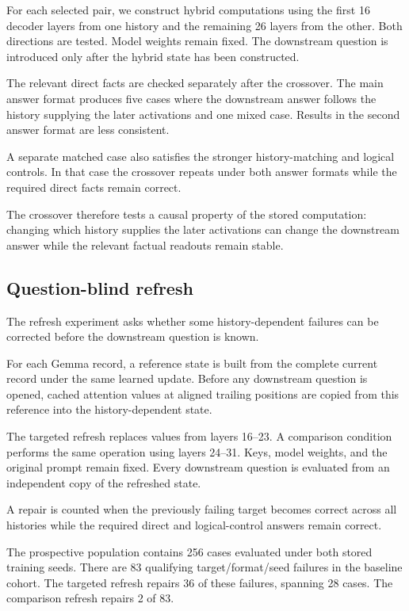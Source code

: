 \documentclass{article}
\begin{document}
For each selected pair, we construct hybrid computations using the first
16 decoder layers from one history and the remaining 26 layers from the
other. Both directions are tested. Model weights remain fixed. The
downstream question is introduced only after the hybrid state has been
constructed.

The relevant direct facts are checked separately after the crossover. The
main answer format produces five cases where the downstream answer follows
the history supplying the later activations and one mixed case. Results in
the second answer format are less consistent.

A separate matched case also satisfies the stronger history-matching and
logical controls. In that case the crossover repeats under both answer
formats while the required direct facts remain correct.

The crossover therefore tests a causal property of the stored computation:
changing which history supplies the later activations can change the
downstream answer while the relevant factual readouts remain stable.

\subsection{Question-blind refresh}
\label{app:question-blind-refresh}

The refresh experiment asks whether some history-dependent failures can be
corrected before the downstream question is known.

For each Gemma record, a reference state is built from the complete current
record under the same learned update. Before any downstream question is
opened, cached attention values at aligned trailing positions are copied from
this reference into the history-dependent state.

The targeted refresh replaces values from layers 16--23. A comparison
condition performs the same operation using layers 24--31. Keys, model
weights, and the original prompt remain fixed. Every downstream question is
evaluated from an independent copy of the refreshed state.

A repair is counted when the previously failing target becomes correct across
all histories while the required direct and logical-control answers remain
correct.

The prospective population contains 256 cases evaluated under both stored
training seeds. There are 83 qualifying target/format/seed failures in the
baseline cohort. The targeted refresh repairs 36 of these failures, spanning
28 cases. The comparison refresh repairs 2 of 83.
\end{document}
